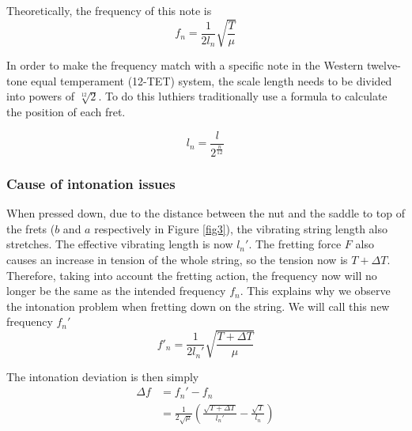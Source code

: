 \documentclass[11pt]{article}
\begin{document}
\begin{flushleft}
                Theoretically, the frequency of this note is 
                \begin{equation}\label{eqn5}
                    f_n = \frac{1}{2l_n}\sqrt{\frac{T}{\mu}}
                \end{equation}

                In order to make the frequency match with a specific note in the Western twelve-tone equal temperament (12-TET) system, the scale length needs to be divided into powers of $\sqrt[12]{2}$. To do this luthiers traditionally use a formula to calculate the position of each fret.

                \begin{equation}\label{eqn6}
                    l_n=\frac{l}{2^\frac{n}{12}}
                \end{equation}
                
            \subsubsection*{Cause of intonation issues}
                When pressed down, due to the distance between the nut and the saddle to top of the frets ($b$ and $a$ respectively in Figure \ref{fig3}), the vibrating string length also stretches. The effective vibrating length is now $l_n'$. The fretting force $F$ also causes an increase in tension of the whole string, so the tension now is $T+ \Delta T$. \\
                Therefore, taking into account the fretting action, the frequency now will no longer be the same as the intended frequency $f_n$. This explains why we observe the intonation problem when fretting down on the string. We will call this new frequency $f_n'$
                \begin{equation}\label{eqn7}
                    f'_n= \frac{1}{2l_n'}\sqrt{\frac{T+\Delta T}{\mu}}
                \end{equation}
                
                The intonation deviation is then simply
                \begin{align}
                    \Delta f &= f_n'-f_n \\
                    &= \frac{1}{2\sqrt{\mu}} \left( \frac{\sqrt{T+\Delta T}}{l_n'} - \frac{\sqrt{T}}{l_n} \right)\label{eqn9}
                \end{align}
                

\end{flushleft}
\end{document}
